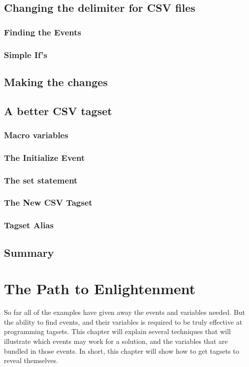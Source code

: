 \documentclass{book}
\begin{document}
\section{Changing the delimiter for CSV files}

\subsection{Finding the Events}

\subsection{Simple If's}

\section{Making the changes}

\section{A better CSV tagset}

\subsection{Macro variables}

\subsection{The Initialize Event}

\subsection{The set statement}

\subsection{The New CSV Tagset}        

\subsection{Tagset Alias}

\section{Summary}

\chapter{The Path to Enlightenment}
So far all of the examples have given away the events and
variables needed.  But the ability to find events, and their
variables is required to be truly effective at programming
tagsets.  This chapter will explain several techniques that
will illustrate which events
may work for a solution, and the variables that are bundled in
those events.  In short, this chapter will show how to get 
tagsets to reveal themselves.
\end{document}

